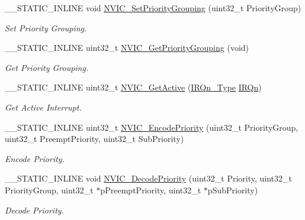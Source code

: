 \begin{DoxyCompactItemize}
\+\_\+\+\_\+\+S\+T\+A\+T\+I\+C\+\_\+\+I\+N\+L\+I\+NE void \mbox{\hyperlink{group___c_m_s_i_s___core___n_v_i_c_functions_ga77cfbb35a9d8027e392034321bed6904}{N\+V\+I\+C\+\_\+\+Set\+Priority\+Grouping}} (uint32\+\_\+t Priority\+Group)
\begin{DoxyCompactList}\small\item\em Set Priority Grouping. \end{DoxyCompactList}\item 
\+\_\+\+\_\+\+S\+T\+A\+T\+I\+C\+\_\+\+I\+N\+L\+I\+NE uint32\+\_\+t \mbox{\hyperlink{group___c_m_s_i_s___core___n_v_i_c_functions_ga394f7ce2ca826c0da26284d17ac6524d}{N\+V\+I\+C\+\_\+\+Get\+Priority\+Grouping}} (void)
\begin{DoxyCompactList}\small\item\em Get Priority Grouping. \end{DoxyCompactList}\item 
\+\_\+\+\_\+\+S\+T\+A\+T\+I\+C\+\_\+\+I\+N\+L\+I\+NE uint32\+\_\+t \mbox{\hyperlink{group___c_m_s_i_s___core___n_v_i_c_functions_ga47a0f52794068d076c9147aa3cb8d8a6}{N\+V\+I\+C\+\_\+\+Get\+Active}} (\mbox{\hyperlink{group___configuration__section__for___c_m_s_i_s_gac3af4a32370fb28c4ade8bf2add80251}{I\+R\+Qn\+\_\+\+Type}} \mbox{\hyperlink{group___configuration__section__for___c_m_s_i_s_ga666eb0caeb12ec0e281415592ae89083}{I\+R\+Qn}})
\begin{DoxyCompactList}\small\item\em Get Active Interrupt. \end{DoxyCompactList}\item 
\+\_\+\+\_\+\+S\+T\+A\+T\+I\+C\+\_\+\+I\+N\+L\+I\+NE uint32\+\_\+t \mbox{\hyperlink{group___c_m_s_i_s___core___n_v_i_c_functions_gadb94ac5d892b376e4f3555ae0418ebac}{N\+V\+I\+C\+\_\+\+Encode\+Priority}} (uint32\+\_\+t Priority\+Group, uint32\+\_\+t Preempt\+Priority, uint32\+\_\+t Sub\+Priority)
\begin{DoxyCompactList}\small\item\em Encode Priority. \end{DoxyCompactList}\item 
\+\_\+\+\_\+\+S\+T\+A\+T\+I\+C\+\_\+\+I\+N\+L\+I\+NE void \mbox{\hyperlink{group___c_m_s_i_s___core___n_v_i_c_functions_ga4f23ef94633f75d3c97670a53949003c}{N\+V\+I\+C\+\_\+\+Decode\+Priority}} (uint32\+\_\+t Priority, uint32\+\_\+t Priority\+Group, uint32\+\_\+t $\ast$p\+Preempt\+Priority, uint32\+\_\+t $\ast$p\+Sub\+Priority)
\begin{DoxyCompactList}\small\item\em Decode Priority. \end{DoxyCompactList}\end{DoxyCompactItemize}


